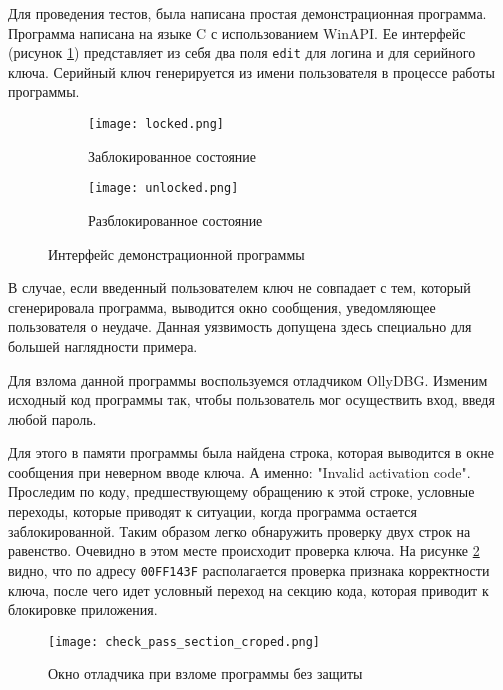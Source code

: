 
Для проведения тестов, была написана простая демонстрационная программа.
Программа написана на языке C с использованием WinAPI. Ее интерфейс (рисунок
\ref{fig:interface}) представляет из себя два поля \verb!edit! для логина и для
серийного ключа. Серийный ключ генерируется из имени пользователя в процессе
работы программы.

\begin{figure}[h!]
  \centering
  \begin{subfigure}[bt]{0.45\textwidth}
    \centering
    \texttt{[image: locked.png]}
    \caption{Заблокированное состояние}
  \end{subfigure}
  \hfill
  \begin{subfigure}[bt]{0.45\textwidth}
    \centering
    \texttt{[image: unlocked.png]}
    \caption{Разблокированное состояние}
  \end{subfigure}
  \caption{Интерфейс демонстрационной программы}
  \label{fig:interface}
\end{figure}

В случае, если введенный пользователем ключ не совпадает с тем, который
сгенерировала программа, выводится окно сообщения, уведомляющее пользователя о
неудаче. Данная уязвимость допущена здесь специально для большей
наглядности примера.

Для взлома данной программы воспользуемся отладчиком OllyDBG. Изменим исходный
код программы так, чтобы пользователь мог осуществить вход, введя любой пароль.

Для этого в памяти программы была найдена строка, которая выводится в окне
сообщения при неверном вводе ключа. А именно: "Invalid activation code".
Проследим по коду, предшествующему обращению к этой строке, условные переходы,
которые приводят к ситуации, когда программа остается заблокированной. Таким
образом легко обнаружить проверку двух строк на равенство. Очевидно в этом месте
происходит проверка ключа. На рисунке \ref{fig:disas_no_protect} видно, что по
адресу \verb!00FF143F! располагается проверка признака корректности ключа, после
чего идет условный переход на секцию кода, которая приводит к блокировке
приложения.

\begin{figure}[htpb]
  \centering
  \texttt{[image: check\_pass\_section\_croped.png]}
  \caption{Окно отладчика при взломе программы без защиты}
  \label{fig:disas_no_protect}
\end{figure}

